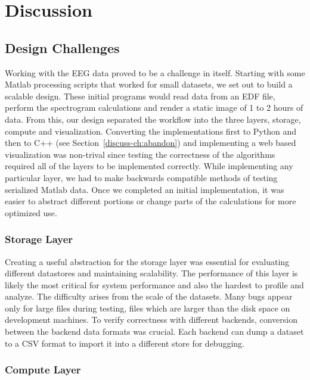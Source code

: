 \chapter{Discussion}\label{discuss-ch}

\section{Design Challenges}

Working with the EEG data proved to be a challenge in itself. Starting with
some Matlab processing scripts that worked for small datasets, we set out to
build a scalable design. These initial programs would read data from an EDF
file, perform the spectrogram calculations and render a static image of 1 to 2
hours of data. From this, our design separated the workflow into the three
layers, storage, compute and visualization. Converting the implementations
first to Python and then to C++ (see Section~\ref{discuss-ch:abandon}) and
implementing a web based visualization was non-trival since testing the
correctness of the algorithms required all of the layers to be implemented
correctly. While implementing any particular layer, we had to make backwards
compatible methods of testing serialized Matlab data. Once we completed an
initial implementation, it was easier to abstract different portions or change
parts of the calculations for more optimized use. \\

\subsection{Storage Layer}

Creating a useful abstraction for the storage layer was essential for
evaluating different datastores and maintaining scalability. The performance of
this layer is likely the most critical for system performance and also the
hardest to profile and analyze. The difficulty arises from the scale of the
datasets. Many bugs appear only for large files during testing, files which are
larger than the disk space on development machines. To verify correctness with
different backends, conversion between the backend data formats was crucial.
Each backend can dump a dataset to a CSV format to import it into a different
store for debugging.

\subsection{Compute Layer}

